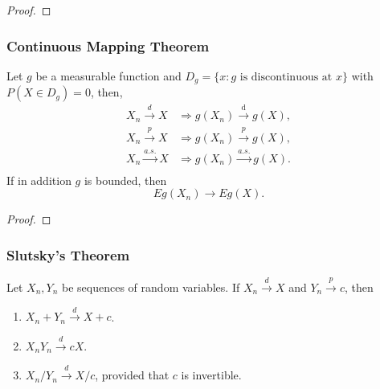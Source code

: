 \begin{proof}

\end{proof}

\subsubsection{Continuous Mapping Theorem}

\begin{theorem} \label{thm:continuous-mapping-theorem}
	Let $g$ be a measurable function and $D_g=\{x:g \text{ is discontinuous at } x\}$ with $P(X\in D_g)=0$, then,
	\begin{equation}
		\begin{aligned}
			X_{n} \stackrel{d}{\rightarrow} X    & \Rightarrow g\left(X_{n}\right) \stackrel{\mathrm{d}}{\rightarrow} g(X), \\
			X_{n} \stackrel{p}{\rightarrow} X    & \Rightarrow g\left(X_{n}\right) \stackrel{p}{\rightarrow} g(X),          \\
			X_{n} \stackrel{a.s.}{\rightarrow} X & \Rightarrow g\left(X_{n}\right) \stackrel{a.s.}{\rightarrow} g(X).       \\
		\end{aligned}
	\end{equation}
	If in addition $g$ is bounded, then
	\begin{equation}
		Eg(X_n)\rightarrow Eg(X).
	\end{equation}
\end{theorem}

\begin{proof}

\end{proof}

\subsubsection{Slutsky's Theorem}

\begin{theorem} \label{thm:slutsky-theorem}
	Let $X_{n}, Y_{n}$ be sequences of random variables. If $X_{n}\stackrel{d}{\rightarrow}X$ and $Y_{n}\stackrel{p}{\rightarrow}c$, then
	\begin{enumerate}
		\item $X_{n}+Y_{n}\stackrel{d}{\rightarrow}X+c$.
		\item $X_{n}Y_{n}\stackrel{d}{\rightarrow}cX$.
		\item $X_{n}/Y_{n}\stackrel{d}{\rightarrow}X/c$, provided that $c$ is invertible.
	\end{enumerate}
\end{theorem}

